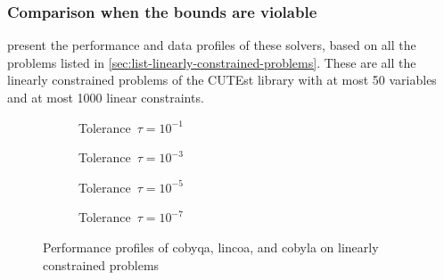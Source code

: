 \subsubsection{Comparison when the bounds are violable}

 present the performance and data profiles of these solvers, based on all the problems listed in \cref{sec:list-linearly-constrained-problems}.
These are all the linearly constrained problems of the CUTEst library with at most \num{50} variables and at most \num[group-minimum-digits=4]{1000} linear constraints.

\begin{figure}[ht]
    \centering
    \begin{subfigure}[b]{0.49\textwidth}
        \centering
        \caption{Tolerance~$\tau = 10^{-1}$}
    \end{subfigure}
    \hfill
    \begin{subfigure}[b]{0.49\textwidth}
        \centering
        \caption{Tolerance~$\tau = 10^{-3}$}
    \end{subfigure}
    \begin{subfigure}[b]{0.49\textwidth}
        \centering
        \caption{Tolerance~$\tau = 10^{-5}$}
    \end{subfigure}
    \hfill
    \begin{subfigure}[b]{0.49\textwidth}
        \centering
        \caption{Tolerance~$\tau = 10^{-7}$}
    \end{subfigure}
    \caption[Performance profiles on linearly constrained problems]{Performance profiles of \gls{cobyqa}, \gls{lincoa}, and \gls{cobyla} on linearly constrained problems}
    \label{fig:perf-linearly-constrained-problems}
\end{figure}

